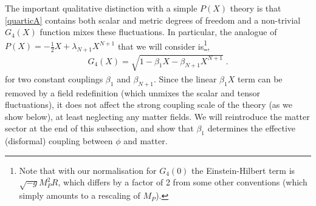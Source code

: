 \documentclass[11pt]{article}
\begin{document}
The important qualitative distinction with a simple $P(X)$ theory is that \eqref{quarticA} contains both scalar and metric degrees of freedom and a non-trivial $G_4 (X)$ function mixes these fluctuations. 
In particular, the analogue of $P(X) = - \frac{1}{2} X + \lambda_{N+1} X^{N+1}$ that we will consider is\footnote{
Note that with our normalisation for $G_4(0)$ the Einstein-Hilbert term is $\sqrt{-g} M_P^2 R$, which differs by a factor of 2 from some other conventions (which simply amounts to a rescaling of $M_P$). 
}, \\[-15pt]
\begin{align}
 G_4 (X) = \sqrt{ 1 - \beta_1 X  - \beta_{N+1} X^{N+1} } \; .
 \label{eqn:G4sq}
\end{align}
for two constant couplings $\beta_1$ and $\beta_{N+1}$. 
Since the linear $\beta_1 X$ term can be removed by a field redefinition (which unmixes the scalar and tensor fluctuations), it does not affect the strong coupling scale of the theory (as we show below), at least neglecting any matter fields. We will reintroduce the matter sector at the end of this subsection, and show that $\beta_1$ determines the effective (disformal) coupling between $\phi$ and matter.


\end{document}
